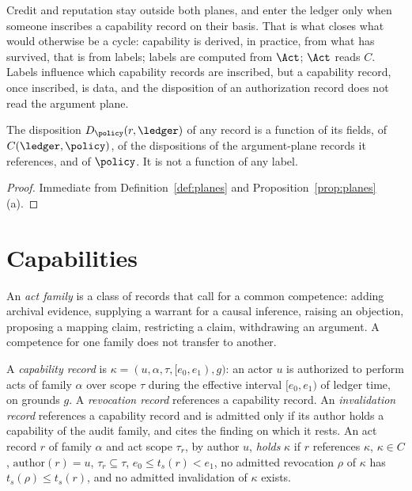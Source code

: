Credit and reputation stay outside both planes, and enter the ledger only when someone inscribes a capability record on their basis. That is what closes what would otherwise be a cycle: capability is derived, in practice, from what has survived, that is from labels; labels are computed from $\Act$; $\Act$ reads $C$. Labels influence which capability records are inscribed, but a capability record, once inscribed, is data, and the disposition of an authorization record does not read the argument plane.

\begin{proposition}\label{prop:noreadlabels}
The disposition $D_\policy(r,\ledger)$ of any record is a function of its fields, of $C(\ledger,\policy)$, of the dispositions of the argument-plane records it references, and of $\policy$. It is not a function of any label.
\end{proposition}

\begin{proof}
Immediate from Definition~\ref{def:planes} and Proposition~\ref{prop:planes}(a).
\end{proof}

\section{Capabilities}\label{sec:acts}

An \emph{act family} is a class of records that call for a common competence: adding archival evidence, supplying a warrant for a causal inference, raising an objection, proposing a mapping claim, restricting a claim, withdrawing an argument. A competence for one family does not transfer to another.

\begin{definition}\label{def:capability}
A \emph{capability record} is $\kappa=(u,\alpha,\tau,[e_0,e_1),g)$: an actor $u$ is authorized to perform acts of family $\alpha$ over scope $\tau$ during the effective interval $[e_0,e_1)$ of ledger time, on grounds $g$. A \emph{revocation record} references a capability record. An \emph{invalidation record} references a capability record and is admitted only if its author holds a capability of the audit family, and cites the finding on which it rests. An act record $r$ of family $\alpha$ and act scope $\tau_r$, by author $u$, \emph{holds} $\kappa$ if $r$ references $\kappa$, $\kappa\in C$, $\mathrm{author}(r)=u$, $\tau_r\subseteq\tau$, $e_0\le t_s(r)<e_1$, no admitted revocation $\rho$ of $\kappa$ has $t_s(\rho)\le t_s(r)$, and no admitted invalidation of $\kappa$ exists.
\end{definition}

